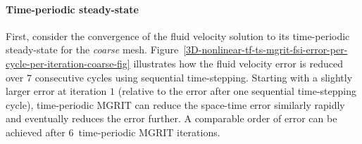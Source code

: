\documentclass[3p]{elsarticle}
\begin{document}
\paragraph{Time-periodic steady-state}
First, consider the convergence of the fluid velocity solution
to its time-periodic steady-state for the \emph{coarse} mesh.
Figure~\ref{3D-nonlinear-tf-ts-mgrit-fsi-error-per-cycle-per-iteration-coarse-fig}
illustrates how the fluid velocity error is reduced over $7$ consecutive cycles
using sequential time-stepping.
Starting with a slightly larger error at iteration $1$ (relative to the error
after one sequential time-stepping cycle), time-periodic MGRIT
can reduce the space-time error similarly rapidly
and eventually reduces the error further.
A comparable order of error can be achieved after $6$~time-periodic MGRIT iterations.
\end{document}
